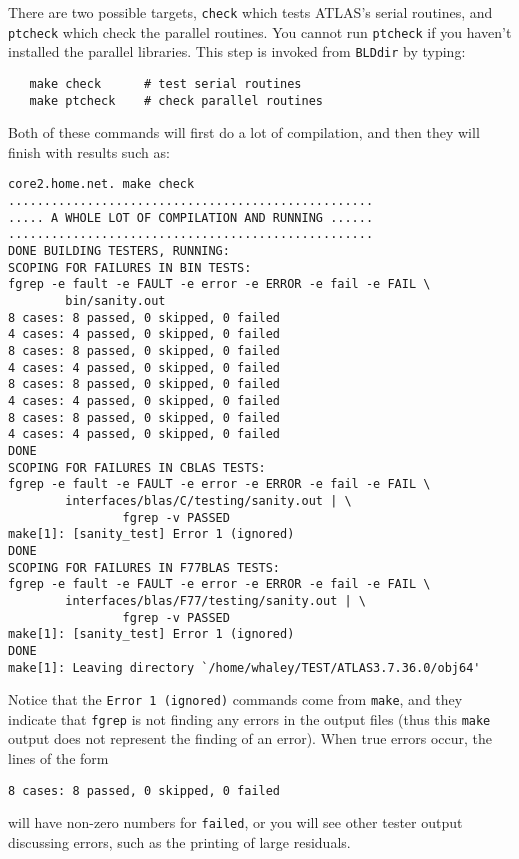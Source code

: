 \documentclass[11pt]{article}
\begin{document}
There are two possible targets, {\tt check} which tests ATLAS's serial
routines, and {\tt ptcheck} which check the parallel routines.  You cannot
run {\tt ptcheck} if you haven't installed the parallel libraries.
This step is invoked from {\tt BLDdir} by typing:
\begin{verbatim}
   make check      # test serial routines
   make ptcheck    # check parallel routines
\end{verbatim}

Both of these commands will first do a lot of compilation, and then they
will finish with results such as:
\vspace*{-0.1in}
\begin{verbatim}
core2.home.net. make check
...................................................
..... A WHOLE LOT OF COMPILATION AND RUNNING ......
...................................................
DONE BUILDING TESTERS, RUNNING:
SCOPING FOR FAILURES IN BIN TESTS:
fgrep -e fault -e FAULT -e error -e ERROR -e fail -e FAIL \
        bin/sanity.out
8 cases: 8 passed, 0 skipped, 0 failed
4 cases: 4 passed, 0 skipped, 0 failed
8 cases: 8 passed, 0 skipped, 0 failed
4 cases: 4 passed, 0 skipped, 0 failed
8 cases: 8 passed, 0 skipped, 0 failed
4 cases: 4 passed, 0 skipped, 0 failed
8 cases: 8 passed, 0 skipped, 0 failed
4 cases: 4 passed, 0 skipped, 0 failed
DONE
SCOPING FOR FAILURES IN CBLAS TESTS:
fgrep -e fault -e FAULT -e error -e ERROR -e fail -e FAIL \
        interfaces/blas/C/testing/sanity.out | \
                fgrep -v PASSED
make[1]: [sanity_test] Error 1 (ignored)
DONE
SCOPING FOR FAILURES IN F77BLAS TESTS:
fgrep -e fault -e FAULT -e error -e ERROR -e fail -e FAIL \
        interfaces/blas/F77/testing/sanity.out | \
                fgrep -v PASSED
make[1]: [sanity_test] Error 1 (ignored)
DONE
make[1]: Leaving directory `/home/whaley/TEST/ATLAS3.7.36.0/obj64'
\end{verbatim}

Notice that the {\tt Error 1 (ignored)} commands come from {\tt make}, and they
indicate that {\tt fgrep} is not finding any errors in the output files
(thus this {\tt make} output does not represent the finding of an error).
When true errors occur, the lines of the form
\vspace*{-0.1in}
\begin{verbatim}
8 cases: 8 passed, 0 skipped, 0 failed
\end{verbatim}

will have non-zero numbers for {\tt failed}, or you will see other tester
output discussing errors, such as the printing of large residuals.
\end{document}
